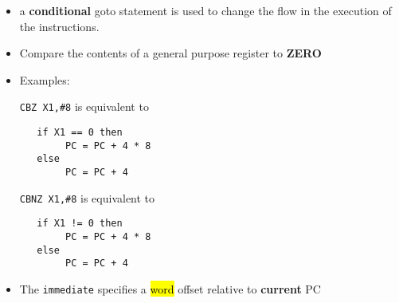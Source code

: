 \begin{frame}[fragile]

\begin{itemize}  
    \item a \textbf{conditional} goto statement is used to change the flow in the execution of the instructions.
\item Compare the contents of a general purpose register to \textbf{ZERO} 
    \item Examples:
    \begin{multicols}{2}
 {\texttt{CBZ X1,\#8}} is equivalent to 
\begin{verbatim}
   if X1 == 0 then
        PC = PC + 4 * 8
   else  
        PC = PC + 4
\end{verbatim}
\columnbreak
 {\texttt{CBNZ X1,\#8}} is equivalent to 
\begin{verbatim}
   if X1 != 0 then
        PC = PC + 4 * 8
   else  
        PC = PC + 4
\end{verbatim}
    \end{multicols}
     
    \item The {\tt immediate} specifies a \hl{word} offset relative to \textbf{current} PC
 
 
\end{itemize}
\BNotes\ifnum{}

\fi\ENotes
\end{frame}



